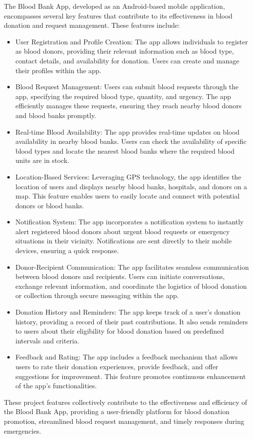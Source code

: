\documentclass{article}
\begin{document}
The Blood Bank App, developed as an Android-based mobile application, encompasses several
key features that contribute to its effectiveness in blood donation and request management.
These features include:
\begin{itemize}
    \item User Registration and Profile Creation: The app allows individuals to register as
blood donors, providing their relevant information such as blood type, contact
details, and availability for donation. Users can create and manage their profiles
within the app.
    \item Blood Request Management: Users can submit blood requests through the app,
specifying the required blood type, quantity, and urgency. The app efficiently
manages these requests, ensuring they reach nearby blood donors and blood
banks promptly.
\item Real-time Blood Availability: The app provides real-time updates on blood
availability in nearby blood banks. Users can check the availability of specific blood
types and locate the nearest blood banks where the required blood units are in
stock.
\item Location-Based Services: Leveraging GPS technology, the app identifies the
location of users and displays nearby blood banks, hospitals, and donors on a map.
This feature enables users to easily locate and connect with potential donors or
blood banks.
\item Notification System: The app incorporates a notification system to instantly alert
registered blood donors about urgent blood requests or emergency situations in
their vicinity. Notifications are sent directly to their mobile devices, ensuring a
quick response.
\item Donor-Recipient Communication: The app facilitates seamless communication
between blood donors and recipients. Users can initiate conversations, exchange
relevant information, and coordinate the logistics of blood donation or collection
through secure messaging within the app.
\item Donation History and Reminders: The app keeps track of a user's donation history,
providing a record of their past contributions. It also sends reminders to users
about their eligibility for blood donation based on predefined intervals and
criteria.
\item Feedback and Rating: The app includes a feedback mechanism that allows users
to rate their donation experiences, provide feedback, and offer suggestions for
improvement. This feature promotes continuous enhancement of the app's
functionalities.
\end{itemize}
These project features collectively contribute to the effectiveness and efficiency of the Blood
Bank App, providing a user-friendly platform for blood donation promotion, streamlined blood
request management, and timely responses during emergencies.
\end{document}
